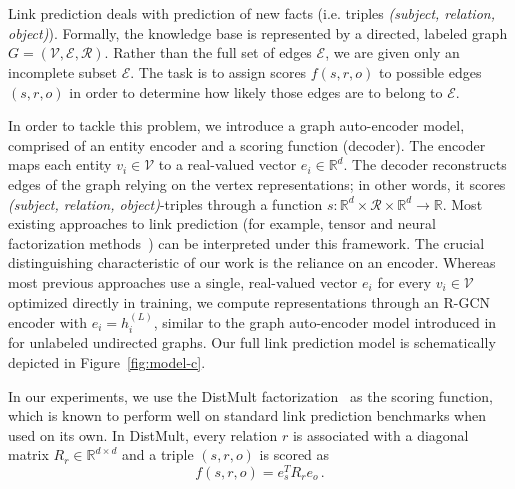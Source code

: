 Link prediction deals with prediction of new facts (i.e. triples \textit{(subject, relation, object)}). Formally, the knowledge base is represented by a directed, labeled graph $G = (\mathcal{V},\mathcal{E},\mathcal{R})$. Rather than the full set of edges $\mathcal{E}$, we are given only an incomplete subset $\hat{\mathcal{E}}$. The task is to assign scores $f(s,r,o)$ to possible edges $(s,r,o)$ in order to determine how likely those edges are to belong to $\mathcal{E}$.

In order to tackle this problem, we introduce a graph auto-encoder model, comprised of an entity encoder and a scoring function (decoder). The encoder maps each entity $v_i \in \mathcal{V}$ to a real-valued vector $e_i \in \mathbb{R}^d$. The decoder reconstructs edges of the graph relying on the vertex representations; in other words, it scores \textit{(subject, relation, object)}-triples through a function $s: \mathbb{R}^d \times \mathcal{R} \times \mathbb{R}^d \to \mathbb{R}$. Most existing approaches to link prediction (for example, tensor and neural factorization methods~\cite{socher2013reasoning,lin2015modeling,toutanova2016compositional,distmult-embedding_entities_and_relations,complex-complex_embeddings_for_simple_link_prediction}) can be interpreted under this framework. The crucial distinguishing characteristic of our work is the reliance on an encoder. Whereas most previous approaches use a single, real-valued vector $e_i$ for every $v_i \in \mathcal{V}$ optimized directly in training, %
we compute representations through an R-GCN encoder with $e_i = h_i^{(L)}$, similar to the graph auto-encoder model introduced in \citet{kipf2016variational} for unlabeled undirected graphs.
Our full link prediction model is schematically depicted in Figure~\ref{fig:model-c}.

In our experiments, we use the DistMult factorization~\cite{distmult-embedding_entities_and_relations} as the scoring function, which is known to perform well on standard link prediction benchmarks when used on its own.
In DistMult, every relation $r$ is associated with a diagonal matrix $R_r
\in \mathbb{R}^{d \times d}$ and a triple $(s, r, o)$ is scored as
\begin{equation}
f(s, r, o) = e_s^T R_r e_o \, .
\end{equation}

